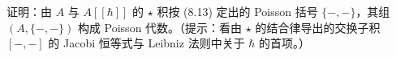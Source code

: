 
\begin{exercise}
证明：由 $A$ 与 $A[[\hbar]]$ 的 $\star$ 积按 (8.13) 定出的 Poisson 括号 $\{-,-\}$，其组 $(A,\{-,-\})$ 构成 Poisson 代数。（提示：看由 $\star$ 的结合律导出的交换子积 $[-, -]$ 的 Jacobi 恒等式与 Leibniz 法则中关于 $\hbar$ 的首项。）
\end{exercise}

